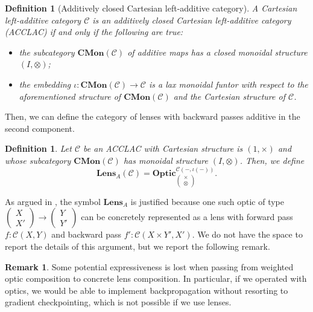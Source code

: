 \documentclass[12pt,a4paper,openright,twoside]{report}
\theoremstyle{plain}
\newtheorem{definition}[proposition]{Definition}
\theoremstyle{definition}
\newtheorem{remark}[proposition]{Remark}
\begin{document}
\begin{definition}[Additively closed Cartesian left-additive category]
  A Cartesian left-additive category $\mathcal{C}$ is an additively closed Cartesian left-additive category (ACCLAC) if and only if the following are true:
  \begin{itemize}
    \item the subcategory $\mathbf{CMon}(\mathcal{C})$ of additive maps has a closed monoidal structure $(I, \otimes)$;
    \item the embedding $\iota: \mathbf{CMon}(\mathcal{C}) \to \mathcal{C}$ is a lax monoidal funtor with respect to the aforementioned structure of $\mathbf{CMon}(\mathcal{C})$ and the Cartesian structure of $\mathcal{C}$.
  \end{itemize}
\end{definition}


Then, we can define the category of lenses with backward passes additive in the second component.

\begin{definition}
  Let $\mathcal{C}$ be an ACCLAC with Cartesian structure is $(1, \times)$ and whose subcategory $\mathbf{CMon}(\mathcal{C})$ has monoidal structure $(I, \otimes)$. Then, we define
  \[\mathbf{Lens}_A(\mathcal{C}) = \mathbf{Optic}_{\left(\begin{smallmatrix}\times \\ \otimes\end{smallmatrix}\right)}^{\mathcal{C}(-,\iota(-))}.\]
\end{definition}

As argued in \cite{gavranovic2024fundamental}, the symbol $\mathbf{Lens}_A$ is justified because one such optic of type $\left(\begin{smallmatrix}X \\ X'\end{smallmatrix}\right) \to \left(\begin{smallmatrix}Y \\ Y'\end{smallmatrix}\right)$ can be concretely represented as a lens with forward pass $f : \mathcal{C}(X,Y)$ and backward pass $f' : \mathcal{C}(X \times Y',X')$. We do not have the space to report the details of this argument, but we report the following remark.

\begin{remark}
  Some potential expressiveness is lost when passing from weighted optic composition to concrete lens composition. In particular, if we operated with optics, we would be able to implement backpropagation without resorting to gradient checkpointing, which is not possible if we use lenses. 
\end{remark}
\end{document}
